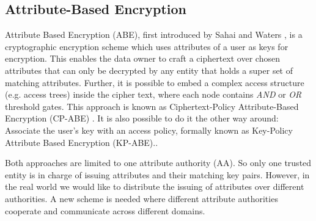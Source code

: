 \documentclass[twocolumn]{article}
\begin{document}
\subsection{Attribute-Based Encryption}
Attribute Based Encryption (ABE), first introduced by Sahai and Waters \cite{sahai2005fuzzy}, is a cryptographic encryption scheme which uses attributes of a user as keys for encryption. This enables the data owner to craft a ciphertext over chosen attributes that can only be decrypted by any entity that holds a super set of matching attributes. Further, it is possible to embed a complex access structure (e.g. access trees) inside the cipher text, where each node contains \textit{AND} or \textit{OR} threshold gates. This approach is known as Ciphertext-Policy Attribute-Based Encryption (CP-ABE) \cite{bethencourt2007ciphertext}. 
It is also possible to do it the other way around: Associate the user's key with an access policy, formally known as Key-Policy Attribute Based Encryption (KP-ABE).\cite{goyal2006attribute}. 

Both approaches are limited to one attribute authority (AA). So only one trusted entity is in charge of issuing attributes and their matching key pairs. However, in the real world we would like to distribute the issuing of attributes over different authorities. A new scheme is needed where different attribute authorities cooperate and communicate across different domains.  

\end{document}
